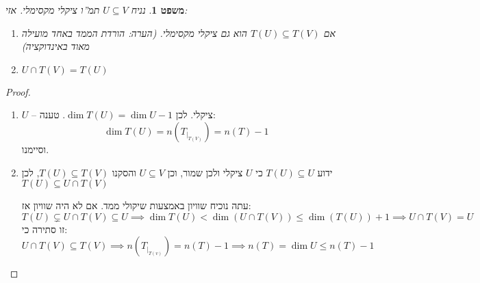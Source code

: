 \documentclass[]{article}
\newcommand\cl [1]    {\left ( #1 \right )}
\newtheorem{Theorem}{משפט}
\theoremstyle{definition}
\newcommand\theo  [1] {\begin{Theorem}#1\end{Theorem}}
\begin{document}
    
    \theo{נניח $U \subseteq V$ תמ''ו ציקלי מקסימלי. אזי: 
    \begin{enumerate}
        \item אם $T(U) \subseteq T(V)$ הוא גם ציקלי מקסימלי. \textsf{(הערה: הורדת הממד באחד מועילה מאוד באינדוקציה)}
        \item $U \cap T(V) = T(U)$ 
    \end{enumerate}}
    \begin{proof}\,
        \begin{enumerate}
            \item $U$ – ציקלי. לכן $\dim T(U) = \dim U - 1$. 
            טענה: 
            \[ \dim T(U) = n\cl{T_{|_{T(V)}}} = n(T) - 1 \]
            וסיימנו. 
            \item ידוע $T(U) \subseteq U$ כי $U$ ציקלי ולכן שמור, וכן $U \subseteq V$ והסקנו $T(U) \subseteq T(V)$, לכן $T(U) \subseteq U \cap T(V)$
            
            עתה נוכיח שוויון באמצעות שיקולי ממד. אם לא היה שוויון אז: 
            \[ T(U) \subsetneq U \cap T(V) \subseteq U \implies \dim T(U) < \dim (U \cap T(V)) \le \dim (T(U)) + 1 \implies U \cap T(V) = U \]
            זו סתירה כי: 
            \[ U \cap T(V) \subseteq T(V) \implies n(T_{|_{T(v)}}) = n(T) - 1 \implies n(T) = \dim U \le n(T) - 1 \]
            
        \end{enumerate}
    \end{proof}
    
\end{document}
